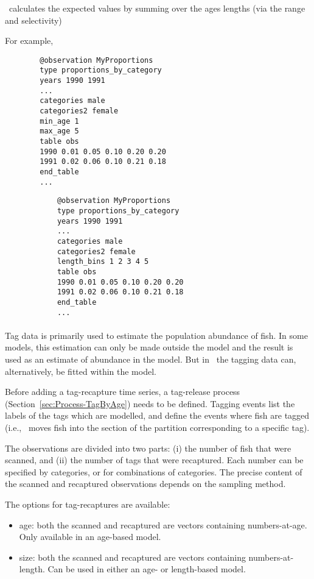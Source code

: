 \CNAME\ calculates the expected values by summing over the \ifAgeBased ages \else lengths \fi (via the range and selectivity)

For example,
\ifAgeBased
{\small{\begin{verbatim}
		@observation MyProportions
		type proportions_by_category
		years 1990 1991
		...
		categories male
		categories2 female
		min_age 1
		max_age 5
		table obs
		1990 0.01 0.05 0.10 0.20 0.20
		1991 0.02 0.06 0.10 0.21 0.18
		end_table
		...
		\end{verbatim}}}
\else
{\small{\begin{verbatim}
			@observation MyProportions
			type proportions_by_category
			years 1990 1991
			...
			categories male
			categories2 female
			length_bins 1 2 3 4 5
			table obs
			1990 0.01 0.05 0.10 0.20 0.20
			1991 0.02 0.06 0.10 0.21 0.18
			end_table
			...
\end{verbatim}}}
\fi 

\ifAgeBased

\paragraph*{\label{sec:Observation-TagRecaptures}\label{sec:Observation-TagRecaptureByAge}\label{sec:Observation-TagRecaptureByLength}}

Tag data is primarily used to estimate the population abundance of fish. In some models, this estimation can only be made outside the model and the result is used as an estimate of abundance in the model. But in \CNAME\ the tagging data can, alternatively, be fitted within the model.

Before adding a tag-recapture time series, a tag-release process (Section~\ref{sec:Process-TagByAge}) needs to be defined. Tagging events list the labels of the tags which are modelled, and define the events where fish are tagged (i.e., \CNAME\ moves fish into the section of the partition corresponding to a specific tag).

The observations are divided into two parts: (i) the number of fish that were scanned, and (ii) the number of tags that were recaptured. Each number can be specified by categories, or for combinations of categories. The precise content of the scanned and recaptured observations depends on the sampling method.

The options for tag-recaptures are available:

\begin{itemize}
	\item age: both the scanned and recaptured are vectors containing numbers-at-age. Only available in an age-based model. 
	\item size: both the scanned and recaptured are vectors containing numbers-at-length. Can be used in either an age- or length-based model.
\end{itemize}

